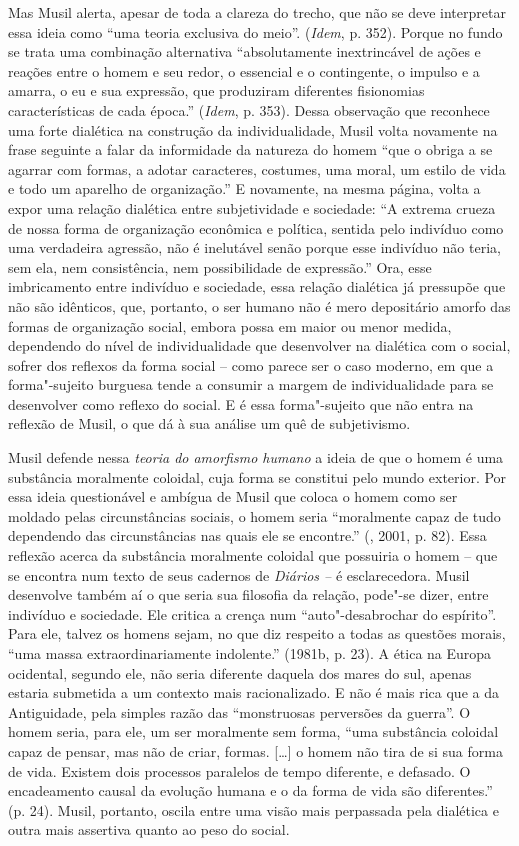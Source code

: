 Mas Musil alerta, apesar de toda a clareza do trecho, que não se deve
interpretar essa ideia como ``uma teoria exclusiva do meio''.
(\emph{Idem}, p. 352). Porque no fundo se trata uma combinação
alternativa ``absolutamente inextrincável de ações e reações entre o
homem e seu redor, o essencial e o contingente, o impulso e a amarra, o
eu e sua expressão, que produziram diferentes fisionomias
características de cada época.'' (\emph{Idem}, p. 353). Dessa observação
que reconhece uma forte dialética na construção da individualidade,
Musil volta novamente na frase seguinte a falar da informidade da
natureza do homem ``que o obriga a se agarrar com formas, a adotar
caracteres, costumes, uma moral, um estilo de vida e todo um aparelho de
organização.'' E novamente, na mesma página, volta a expor uma relação
dialética entre subjetividade e sociedade: ``A extrema crueza de nossa
forma de organização econômica e política, sentida pelo indivíduo como
uma verdadeira agressão, não é inelutável senão porque esse indivíduo
não teria, sem ela, nem consistência, nem possibilidade de expressão.''
Ora, esse imbricamento entre indivíduo e sociedade, essa relação
dialética já pressupõe que não são idênticos, que, portanto, o ser
humano não é mero depositário amorfo das formas de organização social,
embora possa em maior ou menor medida, dependendo do nível de
individualidade que desenvolver na dialética com o social, sofrer dos
reflexos da forma social -- como parece ser o caso moderno, em que a
forma"-sujeito burguesa tende a consumir a margem de individualidade para
se desenvolver como reflexo do social. E é essa forma"-sujeito que não
entra na reflexão de Musil, o que dá à sua análise um quê de
subjetivismo.

Musil defende nessa \emph{teoria do amorfismo humano} a ideia de que o
homem é uma substância moralmente coloidal, cuja forma se constitui pelo
mundo exterior. Por essa ideia questionável e ambígua de Musil que
coloca o homem como ser moldado pelas circunstâncias sociais, o homem
seria ``moralmente capaz de tudo dependendo das circunstâncias nas quais
ele se encontre.'' (, 2001, p. 82). Essa reflexão acerca da
substância moralmente coloidal que possuiria o homem -- que se encontra
num texto de seus cadernos de \emph{Diários --} é esclarecedora. Musil
desenvolve também aí o que seria sua filosofia da relação, pode"-se
dizer, entre indivíduo e sociedade. Ele critica a crença num
``auto"-desabrochar do espírito''. Para ele, talvez os homens sejam, no
que diz respeito a todas as questões morais, ``uma massa
extraordinariamente indolente.'' (1981b, p. 23). A ética na Europa
ocidental, segundo ele, não seria diferente daquela dos mares do sul,
apenas estaria submetida a um contexto mais racionalizado. E não é mais
rica que a da Antiguidade, pela simples razão das ``monstruosas
perversões da guerra''. O homem seria, para ele, um ser moralmente sem
forma, ``uma substância coloidal capaz de pensar, mas não de criar,
formas. [\ldots{}] o homem não tira de si sua forma de vida. Existem
dois processos paralelos de tempo diferente, e defasado. O encadeamento
causal da evolução humana e o da forma de vida são diferentes.'' (p.
24). Musil, portanto, oscila entre uma visão mais perpassada pela
dialética e outra mais assertiva quanto ao peso do social.

